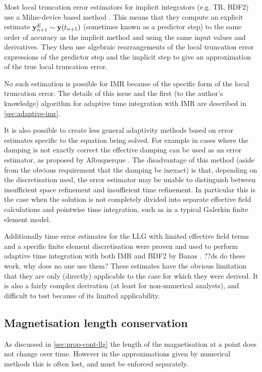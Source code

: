 Most local truncation error estimators for implicit integrators (e.g. TR, BDF2) use a Milne-device based method \cite[707-716]{GreshoSani}.
This means that they compute an explicit estimate $\mathbf{y}^E_{n+1} \sim \mathbf{y}(t_{n+1})$  (sometimes known as a predictor step) to the same order of accuracy as the implicit method and using the same input values and derivatives.
They then use algebraic rearrangements of the local truncation error expressions of the predictor step and the implicit step to give an approximation of the true local truncation error.

No such estimation is possible for IMR because of the specific form of the local truncation error.
The details of this issue and the first (to the author's knowledge) algorithm for adaptive time integration with IMR are described in \cref{sec:adaptive-imr}.

It is also possible to create less general adaptivity methods based on error estimates specific to the equation being solved.
For example in cases where the damping is not exactly correct the effective damping can be used as an error estimator, as proposed by Albuquerque \etal \cite{Albuquerque2001}.
The disadvantage of this method (aside from the obvious requirement that the damping be inexact) is that, depending on the discretisation used, the error estimator may be unable to distinguish between insufficient space refinement and insufficient time refinement.
In particular this is the case when the solution is not completely divided into separate effective field calculations and pointwise time integration, such as in a typical Galerkin finite element model.

Additionally time error estimates for the LLG with limited effective field terms and a specific finite element discretisation were proven and used to perform adaptive time integration with both IMR and BDF2 by Banas \cite{Banas-thesis}.
??ds do these work, why does no one use them?
These estimates have the obvious limitation that they are only (directly) applicable to the case for which they were derived.
It is also a fairly complex derivation (at least for non-numerical analysts), and difficult to test because of its limited applicability.


\subsection{Magnetisation length conservation}
\label{sec:ensuring-constant-mv}

As discussed in \cref{sec:prop-cont-llg} the length of the magnetisation at a point does not change over time.
However in the approximations given by numerical methods this is often lost, and must be enforced separately.

